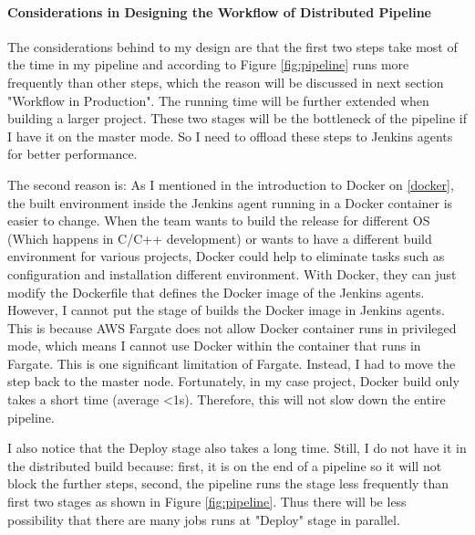 \paragraph[]{Considerations in Designing the Workflow of Distributed Pipeline}
The considerations behind to my design are that the first two steps take most of the time in my pipeline and according to Figure \ref{fig:pipeline} runs more frequently than other steps, which the reason will be discussed in next section "Workflow in Production". The running time will be further extended when building a larger project. These two stages will be the bottleneck of the pipeline if I have it on the master mode. So I need to offload these steps to Jenkins agents for better performance.
\par
The second reason is: As I mentioned in the introduction to Docker on \ref {docker}, the built environment inside the Jenkins agent running in a Docker container is easier to change.
When the team wants to build the release for different OS (Which happens in C/C++ development) or wants to have a different build environment for various projects, Docker could help to eliminate tasks such as configuration and installation different environment. With Docker, they can just modify the Dockerfile that defines the Docker image of the Jenkins agents. 
However, I cannot put the stage of builds the Docker image in Jenkins agents. This is because AWS Fargate does not allow Docker container runs in privileged mode, which means I cannot use Docker within the container that runs in Fargate. This is one significant limitation of Fargate. Instead, I had to move the step back to the master node. Fortunately, in my case project, Docker build only takes a short time (average <1s). Therefore, this will not slow down the entire pipeline.
\par
I also notice that the Deploy stage also takes a long time. Still, I do not have it in the distributed build because: first, it is on the end of a pipeline so it will not block the further steps, second, the pipeline runs the stage less frequently than first two stages as shown in Figure \ref{fig:pipeline}. Thus there will be less possibility that there are many jobs runs at "Deploy" stage in parallel.
